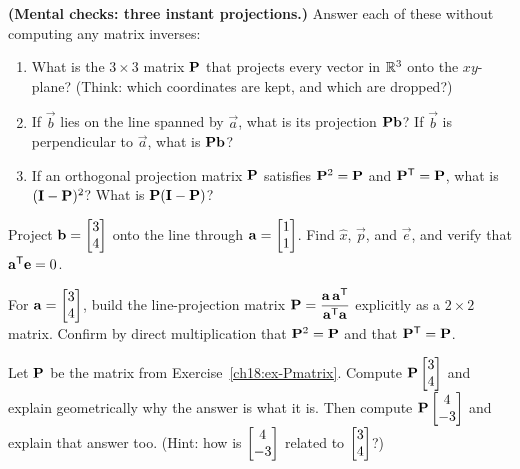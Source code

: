 \begin{exercise}\label{ch18:ex-mental-checks}
\textbf{(Mental checks: three instant projections.)} Answer each of these without computing any matrix inverses:
\begin{enumerate}[label=(\alph*)]
  \item What is the $3\times3$ matrix $\mathbf{P}$ that projects every vector in $\mathbb{R}^3$ onto the $xy$-plane? (Think: which coordinates are kept, and which are dropped?)
  \item If $\vec{b}$ lies on the line spanned by $\vec{a}$, what is its projection $\mathbf{P}\mathbf{b}$? If $\vec{b}$ is perpendicular to $\vec{a}$, what is $\mathbf{P}\mathbf{b}$?
  \item If an orthogonal projection matrix $\mathbf{P}$ satisfies $\mathbf{P}^2=\mathbf{P}$ and $\mathbf{P}^{\mathsf{T}}=\mathbf{P}$, what is $(\mathbf{I}-\mathbf{P})^2$? What is $\mathbf{P}(\mathbf{I}-\mathbf{P})$?
\end{enumerate}
\end{exercise}

\begin{exercise}\label{ch18:ex-line-basic}
Project $\mathbf{b}=\begin{bmatrix}3\\4\end{bmatrix}$ onto the line through $\mathbf{a}=\begin{bmatrix}1\\1\end{bmatrix}$. Find $\hat{x}$,
$\vec{p}$, and $\vec{e}$, and verify that $\mathbf{a}^{\mathsf{T}}\mathbf{e}=0$.
\end{exercise}

\begin{exercise}\label{ch18:ex-Pmatrix}
For $\mathbf{a}=\begin{bmatrix}3\\4\end{bmatrix}$, build the line-projection matrix
$\mathbf{P}=\dfrac{\mathbf{a}\,\mathbf{a}^{\mathsf{T}}}{\mathbf{a}^{\mathsf{T}}\mathbf{a}}$ explicitly as a $2\times2$ matrix. Confirm by
direct multiplication that $\mathbf{P}^2=\mathbf{P}$ and that $\mathbf{P}^{\mathsf{T}}=\mathbf{P}$.
\end{exercise}

\begin{exercise}\label{ch18:ex-already-in}
Let $\mathbf{P}$ be the matrix from Exercise~\ref{ch18:ex-Pmatrix}. Compute $\mathbf{P}\begin{bmatrix}3\\4\end{bmatrix}$ and
explain geometrically why the answer is what it is. Then compute $\mathbf{P}\begin{bmatrix}4\\-3\end{bmatrix}$ and explain
that answer too. (Hint: how is $\begin{bmatrix}4\\-3\end{bmatrix}$ related to $\begin{bmatrix}3\\4\end{bmatrix}$?)
\end{exercise}


